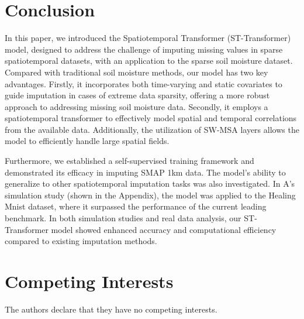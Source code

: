 \documentclass[review]{elsarticle}
\begin{document}
\section{Conclusion}
In this paper, we introduced the Spatiotemporal Transformer (ST-Transformer) model, designed to address the challenge of imputing missing values in sparse spatiotemporal datasets, with an application to the sparse soil moisture dataset. Compared with traditional soil moisture methods, our model has two key advantages. Firstly, it incorporates both time-varying and static covariates to guide imputation in cases of extreme data sparsity, offering a more robust approach to addressing missing soil moisture data. Secondly, it employs a spatiotemporal transformer to effectively model spatial and temporal correlations from the available data. Additionally, the utilization of SW-MSA layers allows the model to efficiently handle large spatial fields. 

Furthermore, we established a self-supervised training framework and demonstrated its efficacy in imputing SMAP 1km data. The model's ability to generalize to other spatiotemporal imputation tasks was also investigated. In A's simulation study (shown in the Appendix), the model was applied to the Healing Mnist dataset, where it surpassed the performance of the current leading benchmark. In both simulation studies and real data analysis, our ST-Transformer model showed enhanced accuracy and computational efficiency compared to existing imputation methods. 

\section*{Competing Interests}
The authors declare that they have no competing interests.


%
%
%
%
\end{document}
